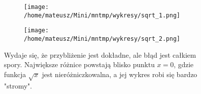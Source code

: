 \documentclass{article}
\begin{document}
	\begin{figure}
		\centering
		\begin{subfigure}{0.8\textwidth}
			\centering
			\texttt{[image: /home/mateusz/Mini/mntmp/wykresy/sqrt\_1.png]}
		\end{subfigure}
		\hfill
		\begin{subfigure}{0.8\textwidth}
			\centering
			\texttt{[image: /home/mateusz/Mini/mntmp/wykresy/sqrt\_2.png]}
		\end{subfigure}
		\caption{Wydaje się, że przybliżenie jest dokładne, ale błąd jest całkiem spory. Największe różnice powstają blisko punktu $x=0$, gdzie funkcja $\sqrt{x}$ jest nieróżniczkowalna, a jej wykres robi się bardzo "stromy".}
	\end{figure}
\clearpage
\end{document}
